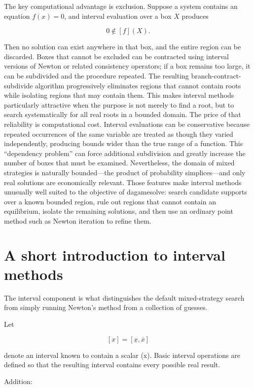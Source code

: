 \documentclass[11pt]{article}
\begin{document}
The key computational advantage is exclusion. Suppose a system contains
an equation \(f(x)=0\), and interval evaluation over a box \(X\)
produces

\[
0\notin [f](X).
\]

Then no solution can exist anywhere in that box, and the entire region
can be discarded. Boxes that cannot be excluded can be contracted using
interval versions of Newton or related consistency operators; if a box
remains too large, it can be subdivided and the procedure repeated. The
resulting branch-contract-subdivide algorithm progressively eliminates
regions that cannot contain roots while isolating regions that may
contain them. This makes interval methods particularly attractive when
the purpose is not merely to find a root, but to search systematically
for all real roots in a bounded domain. The price of that reliability is
computational cost. Interval evaluations can be conservative because
repeated occurrences of the same variable are treated as though they
varied independently, producing bounds wider than the true range of a
function. This ``dependency problem'' can force additional subdivision
and greatly increase the number of boxes that must be examined.
Nevertheless, the domain of mixed strategies is naturally bounded---the
product of probability simplices---and only real solutions are
economically relevant. Those features make interval methods unusually
well suited to the objective of dagamesolve: search candidate supports
over a known bounded region, rule out regions that cannot contain an
equilibrium, isolate the remaining solutions, and then use an ordinary
point method such as Newton iteration to refine them.

    \section{A short introduction to interval
methods}\label{a-short-introduction-to-interval-methods}

The interval component is what distinguishes the default mixed-strategy
search from simply running Newton's method from a collection of guesses.

Let

\[
[x]=[\underline{x},\overline{x}]
\]

denote an interval known to contain a scalar (x). Basic interval
operations are defined so that the resulting interval contains every
possible real result.

Addition:
\end{document}
